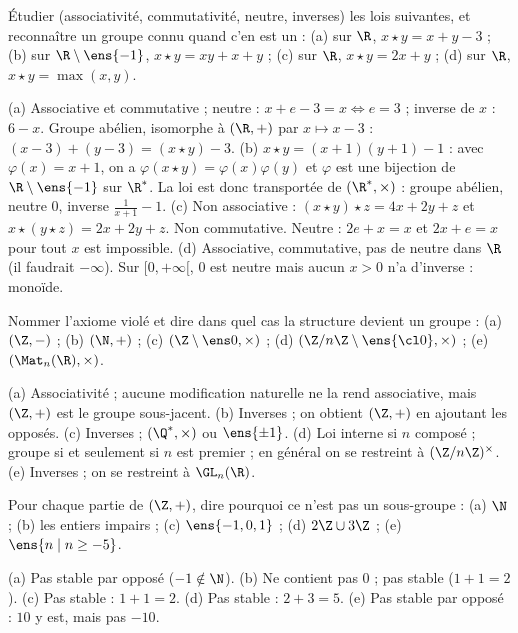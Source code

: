 \begin{exo}
Étudier (associativité, commutativité, neutre, inverses) les lois suivantes, et reconnaître un groupe connu quand c'en est un : (a) sur $\R$, $x\star y=x+y-3$ ; (b) sur $\R\setminus\ens{-1}$, $x\star y=xy+x+y$ ; (c) sur $\R$, $x\star y=2x+y$ ; (d) sur $\R$, $x\star y=\max(x,y)$.
\begin{corrige}
(a) Associative et commutative ; neutre : $x+e-3=x\iff e=3$ ; inverse de $x$ : $6-x$. Groupe abélien, isomorphe à $(\R,+)$ par $x\mapsto x-3$ : $(x-3)+(y-3)=(x\star y)-3$.
(b) $x\star y=(x+1)(y+1)-1$ : avec $\varphi(x)=x+1$, on a $\varphi(x\star y)=\varphi(x)\varphi(y)$ et $\varphi$ est une bijection de $\R\setminus\ens{-1}$ sur $\R^*$. La loi est donc transportée de $(\R^*,\times)$ : groupe abélien, neutre $0$, inverse $\frac1{x+1}-1$.
(c) Non associative : $(x\star y)\star z=4x+2y+z$ et $x\star(y\star z)=2x+2y+z$. Non commutative. Neutre : $2e+x=x$ et $2x+e=x$ pour tout $x$ est impossible.
(d) Associative, commutative, pas de neutre dans $\R$ (il faudrait $-\infty$). Sur $[0,+\infty[$, $0$ est neutre mais aucun $x>0$ n'a d'inverse : monoïde.
\end{corrige}
\end{exo}
\begin{exo}
Nommer l'axiome violé et dire dans quel cas la structure devient un groupe : (a) $(\Z,-)$ ; (b) $(\N,+)$ ; (c) $(\Z\setminus\ens0,\times)$ ; (d) $(\Z/n\Z\setminus\ens{\cl0},\times)$ ; (e) $(\Mat_n(\R),\times)$.
\begin{corrige}
(a) Associativité ; aucune modification naturelle ne la rend associative, mais $(\Z,+)$ est le groupe sous-jacent. (b) Inverses ; on obtient $(\Z,+)$ en ajoutant les opposés. (c) Inverses ; $(\Q^*,\times)$ ou $\ens{\pm1}$. (d) Loi interne si $n$ composé ; groupe si et seulement si $n$ est premier ; en général on se restreint à $(\Z/n\Z)^\times$. (e) Inverses ; on se restreint à $\GL_n(\R)$.
\end{corrige}
\end{exo}
\begin{exo}
Pour chaque partie de $(\Z,+)$, dire pourquoi ce n'est pas un sous-groupe : (a) $\N$ ; (b) les entiers impairs ; (c) $\ens{-1,0,1}$ ; (d) $2\Z\cup3\Z$ ; (e) $\ens{n\mid n\ge-5}$.
\begin{corrige}
(a) Pas stable par opposé ($-1\notin\N$). (b) Ne contient pas $0$ ; pas stable ($1+1=2$). (c) Pas stable : $1+1=2$. (d) Pas stable : $2+3=5$. (e) Pas stable par opposé : $10$ y est, mais pas $-10$.
\end{corrige}
\end{exo}
